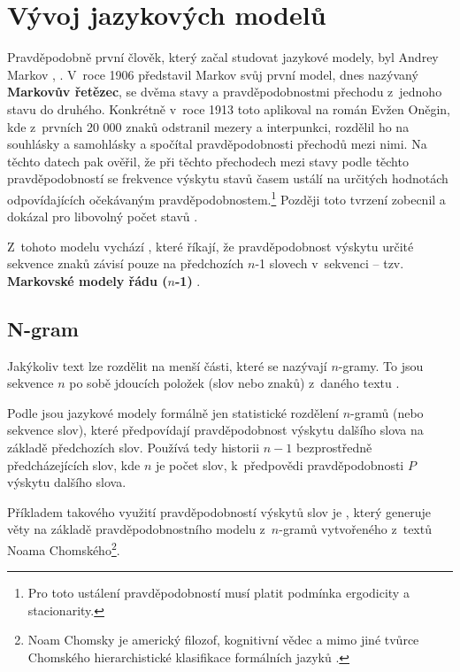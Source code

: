 \documentclass[czech, bc, kiv, he, iso690numb, pdf]{fasthesis}
\begin{document}
\section{Vývoj jazykových modelů}
Pravděpodobně první člověk, který začal studovat jazykové modely, byl Andrey Markov \cite{llm-past-present-future}, \cite{first-links-markov-chain}. V~roce 1906 představil Markov svůj první model, dnes nazývaný \textbf{Markovův řetězec}, se dvěma stavy a pravděpodobnostmi přechodu z~jednoho stavu do druhého. Konkrétně v~roce 1913 toto aplikoval na román Evžen Oněgin, kde z~prvních 20 000 znaků odstranil mezery a interpunkci, rozdělil ho na souhlásky a samohlásky a spočítal pravděpodobnosti přechodů mezi nimi. Na těchto datech pak ověřil, že při těchto přechodech mezi stavy podle těchto pravděpodobností se frekvence výskytu stavů časem ustálí na určitých hodnotách odpovídajících očekávaným pravděpodobnostem.\footnote{Pro toto ustálení pravděpodobností musí platit podmínka ergodicity a stacionarity.} Později toto tvrzení zobecnil a dokázal pro libovolný počet stavů \cite{llm-past-present-future}. %

Z~tohoto modelu vychází , které říkají, že pravděpodobnost výskytu určité sekvence znaků závisí pouze na předchozích $n$-1 slovech v~sekvenci -- tzv. \textbf{Markovské modely řádu ($n$-1)} \cite{llm-past-present-future}.

\subsection{N-gram}
Jakýkoliv text lze rozdělit na menší části, které se nazývají $n$-gramy. To jsou sekvence $n$ po sobě jdoucích položek (slov nebo znaků) z~daného textu \cite{n-grams}.

Podle \cite{n-grams} jsou jazykové modely formálně jen statistické rozdělení $n$-gramů (nebo sekvence slov), které předpovídají pravděpodobnost výskytu dalšího slova na základě předchozích slov. Používá tedy historii $n-1$ bezprostředně předcházejících slov, kde $n$ je počet slov, k~předpovědi pravděpodobnosti $P$ výskytu dalšího slova. 

Příkladem takového využití pravděpodobností výskytů slov je  \cite{chomskybot}, který generuje věty na základě pravděpodobnostního modelu z~$n$-gramů vytvořeného z~textů Noama Chomského\footnote{Noam Chomsky je americký filozof, kognitivní vědec a mimo jiné tvůrce Chomského hierarchistické klasifikace formálních jazyků \cite{chomsky-wiki} \cite{llm-past-present-future}.}.
\end{document}
